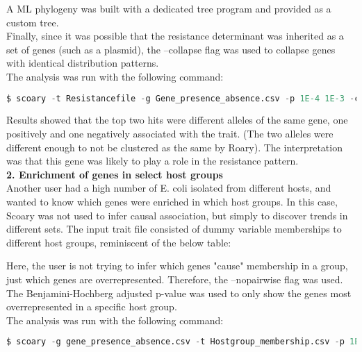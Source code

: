 \documentclass{article}
\begin{document}
    A ML phylogeny was built with a dedicated tree program and provided as a custom tree. \\

    Finally, since it was possible that the resistance determinant was inherited as a set of genes (such as a plasmid), the --collapse flag was used to collapse genes with identical distribution patterns. \\

    The analysis was run with the following command: \\
    \begin{lstlisting}[language=python, basicstyle=\small]
      $ scoary -t Resistancefile -g Gene_presence_absence.csv -p 1E-4 1E-3 -c EPW P -e 10000 -w -r OnlyAbscessusIsolates.csv --collapse -n raxmltree.nwk
    \end{lstlisting}

    Results showed that the top two hits were different alleles of the same gene, one positively and one negatively associated with the trait. (The two alleles were different enough to not be clustered as the same by Roary). The interpretation was that this gene was likely to play a role in the resistance pattern. \\

    \textbf{2. Enrichment of genes in select host groups} \\

    Another user had a high number of E. coli isolated from different hosts, and wanted to know which genes were enriched in which host groups. In this case, Scoary was not used to infer causal association, but simply to discover trends in different sets. The input trait file consisted of dummy variable memberships to different host groups, reminiscent of the below table: \\
    

    Here, the user is not trying to infer which genes "cause" membership in a group, just which genes are overrepresented. Therefore, the --no\textunderscore pairwise flag was used. The Benjamini-Hochberg adjusted p-value was used to only show the genes most overrepresented in a specific host group. \\

    The analysis was run with the following command: \\
    \begin{lstlisting}[language=python, basicstyle=\small]
      $ scoary -g gene_presence_absence.csv -t Hostgroup_membership.csv -p 1E-5 -c BH --no_pairwise
    \end{lstlisting}
\end{document}
